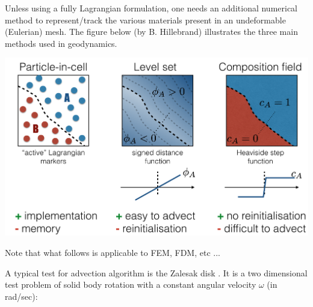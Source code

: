 
Unless using a fully Lagrangian formulation, one needs an additional numerical method to represent/track
the various materials present in an undeformable (Eulerian) mesh.
The figure below (by B. Hillebrand) illustrates the three main methods used in geodynamics.

\begin{center}
\includegraphics[width=15cm]{images/tracking/tracking}
\end{center}

Note that what follows is applicable to FEM, FDM, etc ...


A typical test for advection algorithm is the Zalesak disk \cite{zale79}. It is a two dimensional test 
problem of solid body rotation with a constant angular velocity $\omega$ (in rad/sec):


